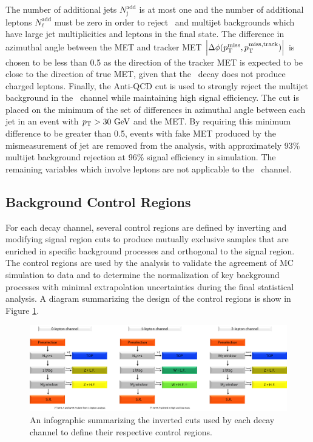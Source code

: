 The number of additional jets $N_{\mathrm{j}}^{\mathrm{add}}$ is at most one and the number of additional leptons $N_{\mathrm{\ell}}^{\mathrm{add}}$ must be zero in order to reject \qrkt\qrktbar\ and multijet backgrounds which have large jet multiplicities and leptons in the final state. The difference in azimuthal angle between the MET and tracker MET $\left| \Delta\phi(p_{\mathrm{T}}^{\mathrm{miss}}, p_{\mathrm{T}}^{\mathrm{miss, track}}) \right|$ is chosen to be less than 0.5 as the direction of the tracker MET is expected to be close to the direction of true MET, given that the \bosZ\ decay does not produce charged leptons. Finally, the Anti-QCD cut is used to strongly reject the multijet background in the \ZnnH\ channel while maintaining high signal efficiency. The cut is placed on the minimum of the set of differences in azimuthal angle between each jet in an event with $p_{\mathrm{T}} > 30\ \mathrm{GeV}$ and the MET. By requiring this minimum difference to be greater than 0.5, events with fake MET produced by the mismeasurement of jet \pT are removed from the analysis, with approximately 93\% multijet background rejection at 96\% signal efficiency in simulation. The remaining variables which involve leptons are not applicable to the \ZnnH\ channel.

\subsection{Background Control Regions} \label{CRs}

For each decay channel, several control regions are defined by inverting and modifying signal region cuts to produce mutually exclusive samples that are enriched in specific background processes and orthogonal to the signal region. The control regions are used by the analysis to validate the agreement of MC simulation to data and to determine the normalization of key background processes with minimal extrapolation uncertainties during the final statistical analysis. A diagram summarizing the design of the control regions is show in Figure \ref{fig:controlregiondef}.

\begin{figure}[htbp]
  \centering
    \includegraphics[width=6in]{images/CR_VH}
    \caption[\VHbb\ Control Region Definitions]{An infographic summarizing the inverted cuts used by each decay channel to define their respective control regions.}
    \label{fig:controlregiondef}
\end{figure}

